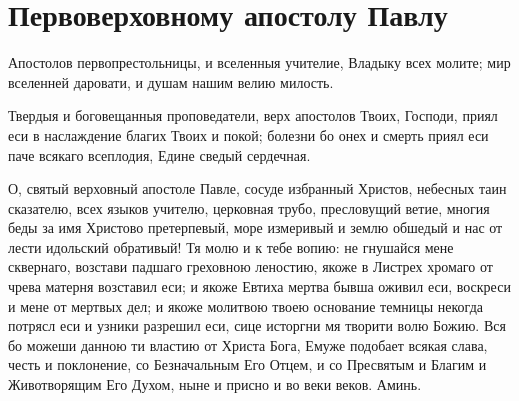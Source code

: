 \label{_content_obiscelenii-nedugov}


\section{Первоверховному апостолу Павлу}\begin{mymulticols}


Апостолов первопрестольницы, и вселенныя учителие, Владыку всех молите; мир вселенней даровати, и душам нашим велию милость.


Твердыя и боговещанныя проповедатели, верх апостолов Твоих, Господи, приял еси в наслаждение благих Твоих и покой; болезни бо онех и смерть приял еси паче всякаго всеплодия, Едине сведый сердечная.


О, святый верховный апостоле Павле, сосуде избранный Христов, небесных таин сказателю, всех языков учителю, церковная трубо, пресловущий ветие, многия беды за имя Христово претерпевый, море измеривый и землю обшедый и нас от лести идольский обративый! Тя молю и к тебе вопию: не гнушайся мене сквернаго, возстави падшаго греховною леностию, якоже в Листрех хромаго от чрева матерня возставил еси; и якоже Евтиха мертва бывша оживил еси, воскреси и мене от мертвых дел; и якоже молитвою твоею основание темницы некогда потрясл еси и узники разрешил еси, сице исторгни мя творити волю Божию. Вся бо можеши данною ти властию от Христа Бога, Емуже подобает всякая слава, честь и поклонение, со Безначальным Его Отцем, и со Пресвятым и Благим и Животворящим Его Духом, ныне и присно и во веки веков. Аминь.

\end{mymulticols}

